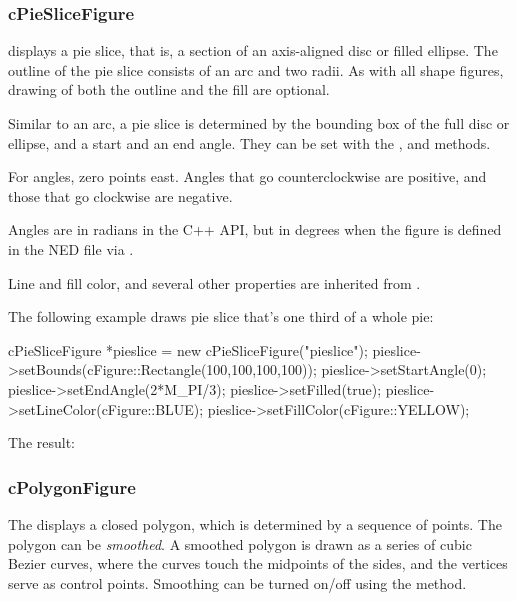 \subsubsection{cPieSliceFigure}
\label{sec:graphics:pieslicefigure}

 displays a pie slice, that is, a section of an
axis-aligned disc or filled ellipse.  The outline of the pie slice consists
of an arc and two radii. As with all shape figures, drawing of both the
outline and the fill are optional.

Similar to an arc, a pie slice is determined by the bounding box of the
full disc or ellipse, and a start and an end angle. They can be set with
the ,  and 
methods.

For angles, zero points east. Angles that go counterclockwise are
positive, and those that go clockwise are negative.

\begin{note}
Angles are in radians in the C++ API, but in degrees when the figure is
defined in the NED file via .
\end{note}

Line and fill color, and several other properties are inherited from
.

The following example draws pie slice that's one third of a whole pie:

\begin{cpp}
cPieSliceFigure *pieslice = new cPieSliceFigure("pieslice");
pieslice->setBounds(cFigure::Rectangle(100,100,100,100));
pieslice->setStartAngle(0);
pieslice->setEndAngle(2*M_PI/3);
pieslice->setFilled(true);
pieslice->setLineColor(cFigure::BLUE);
pieslice->setFillColor(cFigure::YELLOW);
\end{cpp}


The result:

\begin{center}

\end{center}


\subsubsection{cPolygonFigure}
\label{sec:graphics:polygonfigure}

The  displays a closed polygon, which is determined by a sequence of points.
The polygon can be \textit{smoothed}. A smoothed polygon is drawn as a series
of cubic Bezier curves, where the curves touch the midpoints of the sides,
and the vertices serve as control points. Smoothing can be turned on/off
using the  method.


